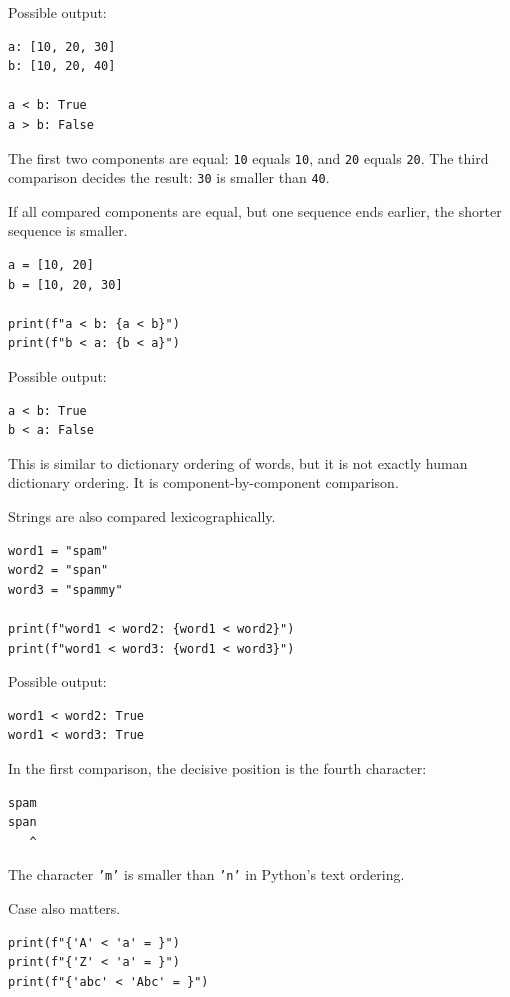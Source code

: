 Possible output:

\begin{verbatim}
a: [10, 20, 30]
b: [10, 20, 40]

a < b: True
a > b: False
\end{verbatim}

The first two components are equal: \texttt{10} equals \texttt{10}, and \texttt{20} equals \texttt{20}. The third comparison decides the result: \texttt{30} is smaller than \texttt{40}.

If all compared components are equal, but one sequence ends earlier, the shorter sequence is smaller.

\begin{verbatim}
a = [10, 20]
b = [10, 20, 30]

print(f"a < b: {a < b}")
print(f"b < a: {b < a}")
\end{verbatim}

Possible output:

\begin{verbatim}
a < b: True
b < a: False
\end{verbatim}

This is similar to dictionary ordering of words, but it is not exactly human dictionary ordering. It is component-by-component comparison.

Strings are also compared lexicographically.

\begin{verbatim}
word1 = "spam"
word2 = "span"
word3 = "spammy"

print(f"word1 < word2: {word1 < word2}")
print(f"word1 < word3: {word1 < word3}")
\end{verbatim}

Possible output:

\begin{verbatim}
word1 < word2: True
word1 < word3: True
\end{verbatim}

In the first comparison, the decisive position is the fourth character:

\begin{verbatim}
spam
span
   ^
\end{verbatim}

The character \texttt{'m'} is smaller than \texttt{'n'} in Python's text ordering.

Case also matters.

\begin{verbatim}
print(f"{'A' < 'a' = }")
print(f"{'Z' < 'a' = }")
print(f"{'abc' < 'Abc' = }")
\end{verbatim}

